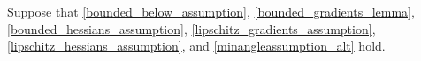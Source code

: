 Suppose that \cref{bounded_below_assumption}, \cref{bounded_gradients_lemma}, \cref{bounded_hessians_assumption}, \cref{lipschitz_gradients_assumption}, \cref{lipschitz_hessians_assumption}, and \cref{minangleassumption_alt} hold.
